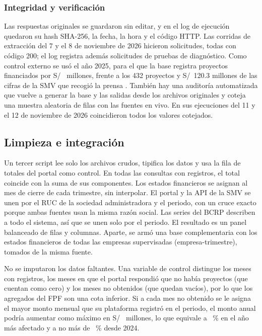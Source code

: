 \subsubsection{Integridad y verificación}

Las respuestas originales se guardaron sin editar, y en el log de ejecución quedaron su hash SHA-256, la fecha, la hora y el código HTTP. Las corridas de extracción del 7 y el 8 de noviembre de 2026 hicieron  solicitudes, todas con código 200; el log registra además  solicitudes de pruebas de diagnóstico. Como control externo se usó el año 2025, para el que la base registra  proyectos financiados por S/~ millones, frente a los 432 proyectos y S/~120.3 millones de las cifras de la SMV que recogió la prensa \parencite{ramirez2026}. También hay una auditoría automatizada que vuelve a generar la base y las salidas desde los archivos originales y coteja una muestra aleatoria de filas con las fuentes en vivo. En sus ejecuciones del 11 y el 12 de noviembre de 2026 coincidieron todos los valores cotejados.

\subsection{Limpieza e integración}

Un tercer script lee solo los archivos crudos, tipifica los datos y usa la fila de totales del portal como control. En todas las consultas con registros, el total coincide con la suma de sus componentes. Los estados financieros se asignan al mes de cierre de cada trimestre, sin interpolar. El portal y la API de la SMV se unen por el RUC de la sociedad administradora y el periodo, con un cruce exacto porque ambas fuentes usan la misma razón social. Las series del BCRP describen a todo el sistema, así que se unen solo por el periodo. El resultado es un panel balanceado de  filas y  columnas. Aparte, se armó una base complementaria con los estados financieros de todas las empresas supervisadas (empresa-trimestre), tomados de la misma fuente.

No se imputaron los datos faltantes. Una variable de control distingue los meses con registros, los meses en que el portal respondió que no había proyectos (que cuentan como cero) y los meses no obtenidos (que quedan vacíos), por lo que los agregados del FPF son una cota inferior. Si a cada mes no obtenido se le asigna el mayor monto mensual que su plataforma registró en el periodo, el monto anual podría aumentar como máximo en S/~ millones, lo que equivale a ~\% en el año más afectado y a no más de ~\% desde 2024.

